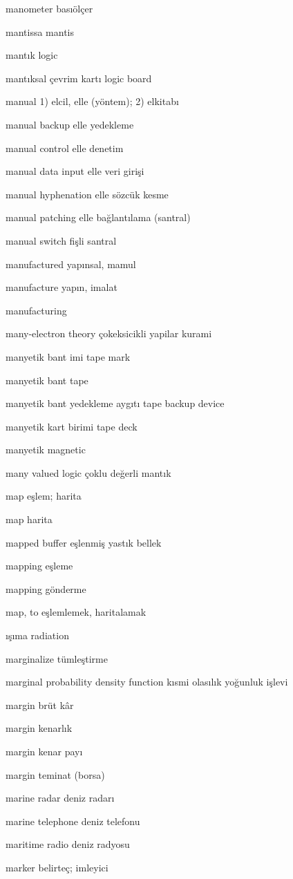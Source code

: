 \documentclass[12pt,fleqn]{article}\usepackage{../../common}
\begin{document}
manometer basıölçer

mantissa mantis

mantık logic

mantıksal çevrim kartı logic board

manual 1) elcil, elle (yöntem); 2) elkitabı

manual backup elle yedekleme

manual control elle denetim

manual data input elle veri girişi

manual hyphenation elle sözcük kesme

manual patching elle bağlantılama (santral)

manual switch fişli santral

manufactured yapınsal, mamul

manufacture yapın, imalat

manufacturing

many-electron theory çokeksicikli yapilar kurami

manyetik bant imi tape mark

manyetik bant tape

manyetik bant yedekleme aygıtı tape backup device

manyetik kart birimi tape deck

manyetik magnetic

many valued logic çoklu değerli mantık

map eşlem; harita

map harita

mapped buffer eşlenmiş yastık bellek

mapping eşleme

mapping gönderme

map, to eşlemlemek, haritalamak

ışıma radiation

marginalize tümleştirme

marginal probability density function kısmi olasılık yoğunluk işlevi

margin brüt kâr

margin kenarlık

margin kenar payı

margin teminat (borsa)

marine radar deniz radarı

marine telephone deniz telefonu

maritime radio deniz radyosu

marker belirteç; imleyici
\end{document}
